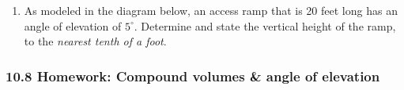 \documentclass[12pt, twoside]{article}
\begin{document}
\begin{enumerate}
\item As modeled in the diagram below, an access ramp that is 20 feet long has an angle of elevation of $5^\circ$. Determine and state the vertical height of the ramp, to the \emph{nearest tenth of a foot}.\\[0.5cm]


  \end{enumerate}
  \newpage
  \setcounter{page}{1}
\subsubsection*{10.8 Homework: Compound volumes \& angle of elevation}
\end{document}
